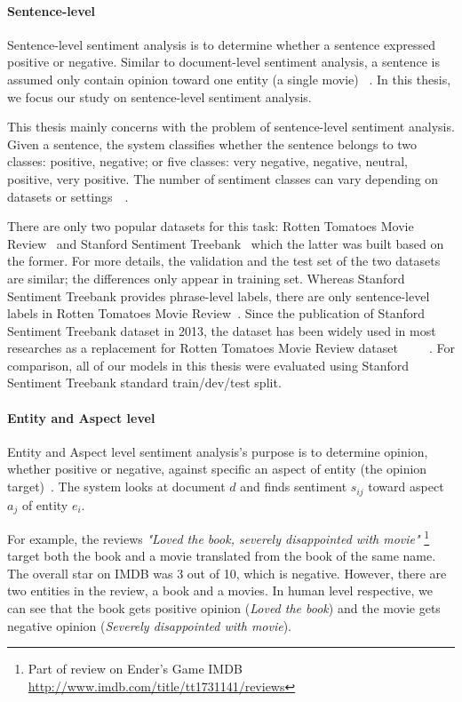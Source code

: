 \paragraph{Sentence-level}\label{sec:sent-level}
Sentence-level sentiment analysis is to determine whether a sentence expressed positive or negative. Similar to document-level sentiment analysis, a sentence is assumed only contain opinion toward one entity (a single movie) ~\cite{liu2012sentiment}.
In this thesis, we focus our study on sentence-level sentiment analysis.

This thesis mainly concerns with the problem of sentence-level sentiment analysis.
Given a sentence, the system classifies whether the sentence belongs to two classes: positive, negative; or five classes: very negative, negative, neutral, positive, very positive.
The number of sentiment classes can vary depending on datasets or settings~\cite{Rotten-Tomato}~\cite{socher2013recursive}.

There are only two popular datasets for this task: Rotten Tomatoes Movie Review~\cite{Rotten-Tomato} and Stanford Sentiment Treebank~\cite{socher2013recursive} which the latter was built based on the former.
For more details, the validation and the test set of the two datasets are similar; the differences only appear in training set.
Whereas Stanford Sentiment Treebank provides phrase-level labels, there are only sentence-level labels in Rotten Tomatoes Movie Review~\cite{socher2013recursive}.
Since the publication of Stanford Sentiment Treebank dataset in 2013, the dataset has been widely used in most researches as a replacement for Rotten Tomatoes Movie Review dataset~\cite{treeLSTM}~\cite{KimCNN}~\cite{cnn-rnn}~\cite{2-layer-cnn}~\cite{socher2013recursive}.
For comparison, all of our models in this thesis were evaluated using Stanford Sentiment Treebank standard train/dev/test split.

\paragraph{Entity and Aspect level}
Entity and Aspect level sentiment analysis's purpose is to determine opinion, whether positive or negative, against specific an aspect of entity (the opinion target)~\cite{liu2012sentiment}. The system looks at document $d$ and finds sentiment $s_{ij}$ toward aspect $a_{j}$ of entity $e_{i}$.

For example, the reviews \textit{"Loved the book, severely disappointed with movie"} \footnote{Part of review on Ender's Game IMDB \url{http://www.imdb.com/title/tt1731141/reviews}} target both the book and a movie translated from the book of the same name. The overall star on IMDB was 3 out of 10, which is negative. However, there are two entities in the review, a book and a movies. In human level respective, we can see that the book gets positive opinion (\textit{Loved the book}) and the movie gets negative opinion (\textit{Severely disappointed with movie}).

